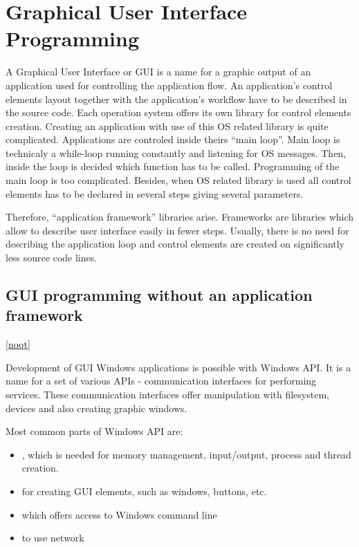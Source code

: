\chapter{Graphical User Interface Programming}
\vspace{-10mm}

A Graphical User Interface or GUI is a name for a graphic output of an application used for controlling the application flow. An application's control elements layout together with the application's workflow have to be described in the source code. Each operation system offers its own library for control elements creation. Creating an application with use of this OS related library is quite complicated. Applications are controled inside theirs ``main loop''. Main loop is technicaly a while-loop running constantly and listening for OS messages. Then, inside the loop is decided which function has to be called. Programming of the main loop is too complicated. Besides, when OS related library is used all control elements has to be declared in several steps giving several parameters.

Therefore, ``application framework'' libraries arise. Frameworks are libraries which allow to describe user interface easily in fewer steps. Usually, there is no need for describing the application loop and control elements are created on significantly less source code lines.


\section{GUI programming without an application framework}
\ref{noqt}


Development of GUI Windows applications is possible with Windows API. It is a name for a set of various APIs - communication interfaces for performing services. These communication interfaces offer manipulation with filesystem, devices and also creating graphic windows.

Most common parts of Windows API are:
\begin{itemize}
\item {}, which is needed for memory management, input/output, process and thread creation.
\item {} for creating GUI elements, such as windows, buttons, etc.
\item {} which offers access to Windows command line
\item {} to use network
\end{itemize}

